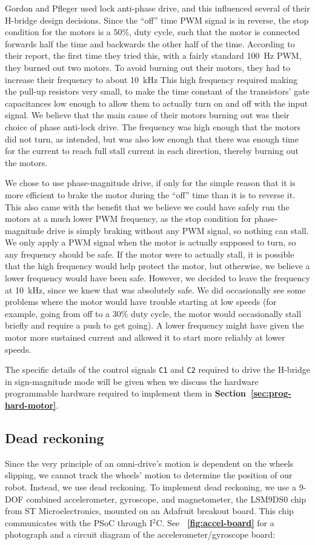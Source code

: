 \documentclass[letterpaper, 11pt]{article}
\newcommand*{\figref}[1]{\textbf{\figurename~\ref{#1}}}
\newcommand*{\secref}[1]{\textbf{Section~\ref{#1}}}
\newcommand{\iic}{I$^2$C\xspace}
\begin{document}
Gordon and Pfleger used lock anti-phase drive, and this influenced several of their H-bridge design decisions. Since the ``off'' time PWM signal is in reverse, the stop condition for the motors is a $50\%$, duty cycle, such that the motor is connected forwards half the time and backwards the other half of the time. According to their report, the first time they tried this, with a fairly standard \SI{100}{\hertz} PWM, they burned out two motors. To avoid burning out their motors, they had to increase their frequency to about \SI{10}{\kilo\hertz} This high frequency required making the pull-up resistors very small, to make the time constant of the transistors' gate capacitances low enough to allow them to actually turn on and off with the input signal. We believe that the main cause of their motors burning out was their choice of phase anti-lock drive. The frequency was high enough that the motors did not turn, as intended, but was also low enough that there was enough time for the current to reach full stall current in each direction, thereby burning out the motors.

We chose to use phase-magnitude drive, if only for the simple reason that it is more efficient to brake the motor during the ``off'' time than it is to reverse it. This also came with the benefit that we believe we could have safely run the motors at a much lower PWM frequency, as the stop condition for phase-magnitude drive is simply braking without any PWM signal, so nothing can stall. We only apply a PWM signal when the motor is actually supposed to turn, so any frequency should be safe. If the motor were to actually stall, it is possible that the high frequency would help protect the motor, but otherwise, we believe a lower frequency would have been safe. However, we decided to leave the frequency at \SI{10}{\kilo\hertz}, since we knew that was absolutely safe. We did occasionally see some problems where the motor would have trouble starting at low speeds (for example, going from off to a $30\%$ duty cycle, the motor would occasionally stall briefly and require a push to get going). A lower frequency might have given the motor more sustained current and allowed it to start more reliably at lower speeds.

The specific details of the control signals \texttt{C1} and \texttt{C2} required to drive the H-bridge in sign-magnitude mode will be given when we discuss the hardware programmable hardware required to implement them in \secref{sec:prog-hard-motor}.

\subsection{Dead reckoning}
Since the very principle of an omni-drive's motion is dependent on the wheels slipping, we cannot track the wheels' motion to determine the position of our robot. Instead, we use dead reckoning. To implement dead reckoning, we use a 9-DOF combined accelerometer, gyroscope, and magnetometer, the LSM9DS0 chip from ST Microelectronics, mounted on an Adafruit breakout board. This chip communicates with the PSoC through \iic. See \figref{fig:accel-board} for a photograph and a circuit diagram of the accelerometer/gyroscope board:
\end{document}
